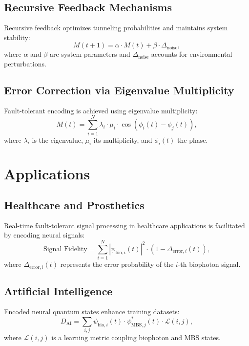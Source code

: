 \documentclass{article}
\theoremstyle{plain}
\theoremstyle{definition}
\begin{document}
\subsection{Recursive Feedback Mechanisms}
Recursive feedback optimizes tunneling probabilities and maintains system stability:
\begin{equation}
M(t+1) = \alpha \cdot M(t) + \beta \cdot \Delta_{\text{noise}},
\end{equation}
where $\alpha$ and $\beta$ are system parameters and $\Delta_{\text{noise}}$ accounts for environmental perturbations.

\subsection{Error Correction via Eigenvalue Multiplicity}
Fault-tolerant encoding is achieved using eigenvalue multiplicity:
\begin{equation}
M(t) = \sum_{i=1}^N \lambda_i \cdot \mu_i \cdot \cos(\phi_i(t) - \phi_j(t)),
\end{equation}
where $\lambda_i$ is the eigenvalue, $\mu_i$ its multiplicity, and $\phi_i(t)$ the phase.

\section{Applications}

\subsection{Healthcare and Prosthetics}
Real-time fault-tolerant signal processing in healthcare applications is facilitated by encoding neural signals:
\begin{equation}
\text{Signal Fidelity} = \sum_{i=1}^N \left| \psi_{\text{bio},i}(t) \right|^2 \cdot \left(1 - \Delta_{\text{error},i}(t) \right),
\end{equation}
where $\Delta_{\text{error},i}(t)$ represents the error probability of the $i$-th biophoton signal.

\subsection{Artificial Intelligence}
Encoded neural quantum states enhance training datasets:
\begin{equation}
D_{\text{AI}} = \sum_{i,j} \psi_{\text{bio},i}(t) \cdot \psi_{\text{MBS},j}^*(t) \cdot \mathcal{L}(i, j),
\end{equation}
where $\mathcal{L}(i, j)$ is a learning metric coupling biophoton and MBS states.
\end{document}
